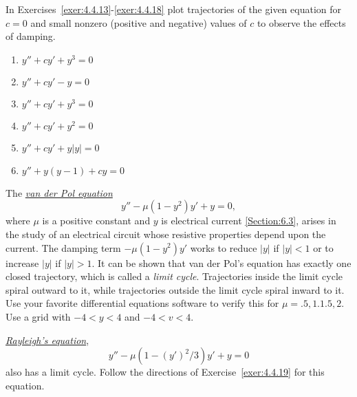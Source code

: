 \documentclass{ximera}
\begin{document}
\begin{problem}
In Exercises~\ref{exer:4.4.13}-\ref{exer:4.4.18}
plot trajectories of the given equation for $c=0$ and small nonzero
(positive and negative) values of $c$ to observe the effects of
damping.

\begin{enumerate}
\item\label{exer:4.4.13} $y''+cy'+y^3=0$
\item\label{exer:4.4.14} $y''+cy'-y=0$
\item\label{exer:4.4.15} $y''+cy'+y^3=0$
\item\label{exer:4.4.16} $y''+cy'+y^2=0$
\item\label{exer:4.4.17} $y''+cy'+y|y|=0$
\item\label{exer:4.4.18} $y''+y(y-1)+cy=0$
\end{enumerate}
\end{problem}

\begin{problem}\label{exer:4.4.19} 
The \href{http://www-history.mcs.st-and.ac.uk/Mathematicians/Van_der_Pol.html}
{\emph{van der Pol equation}}
\begin{equation}\label{eqA:4.4.19}
y''-\mu(1-y^2)y'+y=0,
\end{equation}
where $\mu$ is a positive constant and $y$ is electrical current
\ref{Section:6.3}, arises in the study of an electrical circuit
whose resistive properties depend upon the current. The damping term
$-\mu(1-y^2)y'$ works to reduce $|y|$ if $|y|<1$ or to increase $|y|$
if
$|y|>1$. It can be shown that van der
Pol's equation has exactly one closed trajectory, which is called a
\emph{limit cycle}. Trajectories inside the limit cycle spiral
outward to it, while trajectories outside the limit cycle spiral
inward to it. 
Use your favorite differential equations software  to verify this for
$\mu=.5,1.1.5,2$. Use a grid with $-4<y<4$ and $-4<v<4$.

\end{problem}


\begin{problem}\label{exer:4.4.20}  
\href{http://www-history.mcs.st-and.ac.uk/Mathematicians/Rayleigh.html}
{\emph{Rayleigh's equation}},
$$
y''-\mu(1-(y')^2/3)y'+y=0
$$
also has a limit cycle. Follow the directions of
Exercise~\ref{exer:4.4.19} for this equation.
\end{problem}
\end{document}
